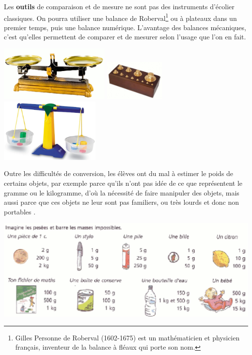 {   Les {\bf outils} de comparaison et de mesure ne sont pas des instruments d'écolier classiques. On pourra utiliser une balance de Roberval\footnote{Gilles Personne de Roberval (1602-1675) est un mathématicien et physicien français, inventeur de la balance à fléaux qui porte son nom.} ou à plateaux dans un premier temps, puis une balance numérique. L'avantage des balances mécaniques, c'est qu'elles permettent de comparer et de mesurer selon l'usage que l'on en fait. 
\begin{center}
   \includegraphics[width=5.5cm]{Grandeurs_mesures_did/Images/Grm7_cours_Robervall}
   \quad
   \includegraphics[width=3cm]{Grandeurs_mesures_did/Images/Grm7_cours_poids}
   \qquad
   \includegraphics[width=5cm]{Grandeurs_mesures_did/Images/Grm7_cours_balance_plateaux}
\end{center}
Outre les difficultés de conversion, les élèves ont du mal à estimer le poids de certains objets, par exemple parce qu'ils n'ont pas idée de ce que représentent le gramme ou le kilogramme, d'où la nécessité de faire manipuler des objets, mais aussi parce que ces objets ne leur sont pas familiers, ou très lourds et donc non \og portables \fg.

\begin{center}
   \includegraphics[width=15cm]{Grandeurs_mesures_did/Images/Grm7_cours_masses}
\end{center}


}
